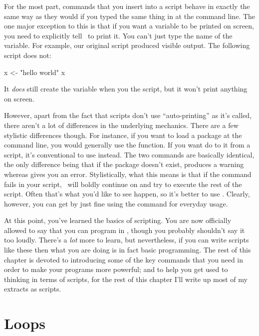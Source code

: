 
For the most part, commands that you insert into a script behave in exactly the same way as they would if you typed the same thing in at the command line. The one major exception to this is that if you want a variable to be printed on screen, you need to explicitly tell \R\ to print it. You can't just type the name of the variable. For example, our original  script produced visible output. The following script does not:

\begin{script}
x <- "hello world"
x
\end{script}
It {\it does} still create the variable  when you  the script, but it won't print anything on screen. 

However, apart from the fact that scripts don't use ``auto-printing'' as it's called, there aren't a lot of differences in the underlying mechanics. There are a few stylistic differences though. For instance, if you want to load a package at the command line, you would generally use the  function. If you want do to it from a script, it's conventional to use  instead. The two commands are basically identical, the only difference being that if the package doesn't exist,  produces a warning whereas  gives you an error. Stylistically, what this means is that if the  command fails in your script, \R\ will boldly continue on and try to execute the rest of the script. Often that's what you'd like to see happen, so it's better to use . Clearly, however, you can get by just fine using the  command for everyday usage.



At this point, you've learned the basics of scripting. You are now officially allowed to say that you can program in \R, though you probably shouldn't say it too loudly. There's a {\it lot} more to learn, but nevertheless, if you can write scripts like these then what you are doing is in fact basic programming. The rest of this chapter is devoted to introducing some of the key commands that you need in order to make your programs more powerful; and to help you get used to thinking in terms of scripts, for the rest of this chapter I'll write up most of my extracts as scripts.


\section{Loops\label{sec:loops}}

